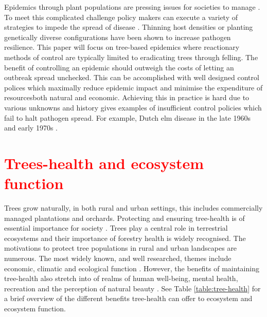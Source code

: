 Epidemics through plant populations are pressing issues for societies to manage \cite{pests-intro}. To meet this complicated challenge policy makers can execute a variety of strategies to impede the spread of disease \cite{Gilligan-disease-management}. Thinning host densities \cite{resiliency-density-reductions} or planting genetically diverse configurations \cite{burdon1982host, huang1980importance, doi:10.1094/PD-89-0969, genetic-heterogeneity} have been shown to increase pathogen resilience. This paper will focus on tree-based epidemics where reactionary methods of control are typically limited to eradicating trees through felling.
The benefit of controlling an epidemic should outweigh the costs of letting an outbreak spread unchecked. This can be accomplished with well designed control polices which maximally reduce epidemic impact and minimise the expenditure of resources\textemdash both natural and economic. Achieving this in practice is hard due to various unknowns \cite{13-challenges} and history gives examples of insufficient control policies which fail to halt pathogen spread. For example, Dutch elm disease in the late 1960s and early 1970s \cite{dutch-elm-mismanage}. 


\section{\textcolor{red}{Trees-health and ecosystem function}}
Trees grow naturally, in both rural and urban settings, this includes commercially managed plantations and orchards. Protecting and ensuring tree-health is of essential importance for society \cite{Boyd1235773}. Trees play a central role in terrestrial ecosystems \cite{boyd2013consequence} and their importance of forestry health is widely recognised. The motivations to protect tree populations in rural and urban landscapes are numerous. The most widely known, and well researched, themes include economic, climatic and ecological function \cite{freer2017tree}. However, the benefits of maintaining tree-health also stretch into of realms of human well-being, mental health, recreation and the perception of natural beauty \cite{tyrvainen2005benefits}. See Table \ref{table:tree-health} for a brief overview of the different benefits tree-health can offer to ecosystem and ecosystem function.\\

